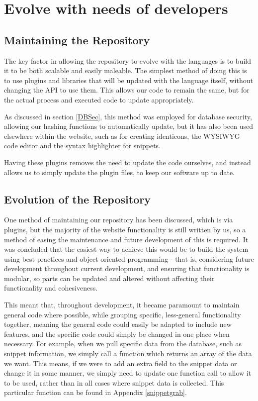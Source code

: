\section{Evolve with needs of developers} \label{evolvewithneeds}
\subsection{Maintaining the Repository}
The key factor in allowing the repository to evolve with the languages is to build it to be both scalable and easily maleable.
The simplest method of doing this is to use plugins and libraries that will be updated with the language itself, without changing the API to use them.
This allows our code to remain the same, but for the actual process and executed code to update appropriately.

As discussed in section \ref{DBSec}, this method was employed for database security, allowing our hashing functions to automatically update, but it has also been used elsewhere within the website, such as for creating identicons, the WYSIWYG code editor and the syntax highlighter for snippets.

Having these plugins removes the need to update the code ourselves, and instead allows us to simply update the plugin files, to keep our software up to date.

\subsection{Evolution of the Repository}
One method of maintaining our repository has been discussed, which is via plugins, but the majority of the website functionality is still written by us, so a method of easing the maintenance and future development of this is required.
It was concluded that the easiest way to achieve this would be to build the system using best practices and object oriented programming - that is, considering future development throughout current development, and ensuring that functionality is modular, so parts can be updated and altered without affecting their functionality and cohesiveness.

This meant that, throughout development, it became paramount to maintain general code where possible, while grouping specific, less-general functionality together, meaning the general code could easily be adapted to include new features, and the specific code could simply be changed in one place when necessary. 
For example, when we pull specific data from the database, such as snippet information, we simply call a function which returns an array of the data we want.
This means, if we were to add an extra field to the snippet data or change it in some manner, we simply need to update one function call to allow it to be used, rather than in all cases where snippet data is collected.
This particular function can be found in Appendix \ref{snippetgrab}.

